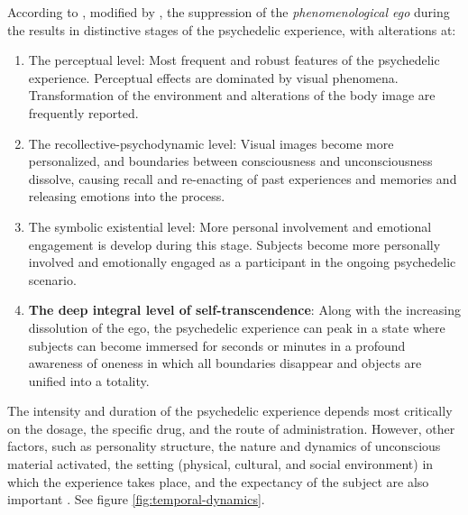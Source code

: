 According to \textcite{masters2000varieties}, modified by \textcite{preller2016phenomenology}, the suppression of the \textit{phenomenological ego} during the results in distinctive stages of the psychedelic experience, with alterations at:

\begin{enumerate}
    \setlength{\itemsep}{0pt}
    \setlength{\parskip}{0pt}
    \item The perceptual level: Most frequent and robust features of the psychedelic experience. Perceptual effects are dominated by visual phenomena. Transformation of the environment and alterations of the body image are frequently reported.
    \item The recollective-psychodynamic level: Visual images become more personalized, and boundaries between consciousness and unconsciousness dissolve, causing recall and re-enacting of past experiences and memories and releasing emotions into the process.
    \item The symbolic existential level: More personal involvement and emotional engagement is develop during this stage. Subjects become more personally involved and emotionally engaged as a participant in the ongoing psychedelic scenario.
    \item \textbf{The deep integral level of self-transcendence}: Along with the increasing dissolution of the ego, the psychedelic experience can peak in a state where subjects can become immersed for seconds or minutes in a profound awareness of oneness in which all boundaries disappear and objects are unified into a totality.
\end{enumerate}

The intensity and duration of the psychedelic experience depends most critically on the dosage, the specific drug, and the route of administration. However, other factors, such as personality structure, the nature and dynamics of unconscious material activated, the setting (physical, cultural, and social environment) in which the experience takes place, and the expectancy of the subject are also important \autocite{preller2016phenomenology}. See figure \ref{fig:temporal-dynamics}.

